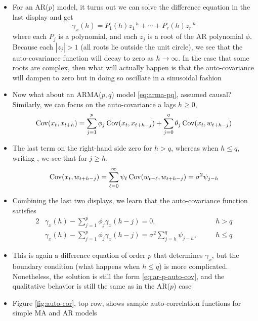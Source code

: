 \documentclass{article}
\begin{document}
\begin{itemize}
\item For an AR($p$) model, it turns out we can solve the difference equation in
  the 
  last display and get
  \begin{equation}
  \label{eq:ar-p-auto-cov}
  \gamma_x(h) = P_1(h) z_1^{-h} + \cdots + P_r(h) z_r^{-h}
  \end{equation}
  where each $P_j$ is a polynomial, and each $z_j$ is a root of the AR
  polynomial $\phi$. Because each $|z_j| > 1$ (all roots lie outside the unit
  circle), we see that the auto-covariance function will decay to zero as $h \to
  \infty$. In the case that some roots are complex, then what will actually 
  happen is that the auto-covariance will dampen to zero but in doing so
  oscillate in a sinusoidal fashion

\item Now what about an ARMA($p,q$) model \eqref{eq:arma-pq}, assumed
  causal? Similarly, we can focus on the auto-covariance a lags $h \geq 0$, 
  \[
  \operatorname{Cov}(x_t, x_{t+h}) = \sum_{j=1}^p \phi_j \operatorname{Cov}(x_t, x_{t+h-j}) + \sum_{j=0}^q 
  \theta_j \operatorname{Cov}(x_t, w_{t+h-j})  
  \]

\item The last term on the right-hand side zero for $h>q$, whereas when $h \leq
  q$, writing , we see
  that for $j \geq h$, 
  \[
  \operatorname{Cov}(x_t, w_{t+h-j}) = \sum_{\ell=0}^\infty \psi_\ell \operatorname{Cov}(w_{t-\ell},
  w_{t+h-j}) = \sigma^2 \psi_{j-h}   
  \]

\item Combining the last two displays, we learn that the auto-covariance
  function satisfies 
  \begin{alignat*}{2}
  &\gamma_x(h) - \sum_{j=1}^p \phi_j \gamma_x(h-j) = 0, \quad &&h > q \\ 
  &\gamma_x(h) - \sum_{j=1}^p \phi_j \gamma_x(h-j) = \sigma^2 \sum_{j=h}^q
    \psi_{j-h}, \quad &&h \leq q
  \end{alignat*}

\item This is again a difference equation of order $p$ that determines
  $\gamma_x$, but the boundary condition (what happens when $h \leq q$) is more
  complicated. Nonetheless, the solution is still the form
  \eqref{eq:ar-p-auto-cov}, and the qualitative behavior is still the same as in 
  the AR($p$) case   

\item Figure \ref{fig:auto-cor}, top row, shows sample auto-correlation
  functions for simple MA and AR models 


\end{itemize}
\end{document}
